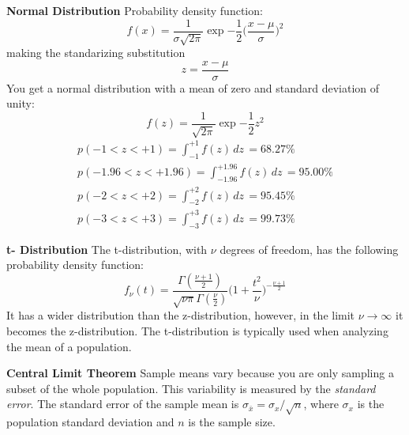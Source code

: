\vspace{+3.5mm}
\textbf{Normal Distribution}
\newline
Probability density function:
\vspace{-5.0mm}
\begin{equation}
f(x) = \frac{1}{\sigma \sqrt{2\pi}} \exp{-\frac{1}{2}\Bigg(\frac{x-\mu}{\sigma}\Bigg)^2}
\end{equation}
% 
making the standarizing substitution
\begin{equation}
z = \frac{x-\mu}{\sigma}
\end{equation}
% 
You get a normal distribution with a mean of zero and standard deviation of unity:
\begin{equation}
f(z) = \frac{1}{\sqrt{2\pi}} \exp{-\frac{1}{2} z^2}
\end{equation}
% 
\begin{equation}
\begin{array}{l}
p(-1 < z < +1) = \int_{-1}^{+1} f(z) \, dz \, = 68.27\%
\\ p(-1.96 < z < +1.96) = \int_{-1.96}^{+1.96} f(z) \, dz \, = 95.00\%
\\ p(-2 < z < +2) = \int_{-2}^{+2} f(z) \, dz \, = 95.45\%
\\ p(-3 < z < +3) = \int_{-3}^{+3} f(z) \, dz \, = 99.73\%
\end{array}
\end{equation}

\vspace{+3.5mm}
\textbf{t- Distribution}
\newline
The t-distribution, with $\nu$ degrees of freedom, has the following probability density function:
% 
\begin{equation}
f_{\nu}(t) = \frac{\Gamma(\frac{\nu + 1}{2})}{\sqrt{\nu \pi} \Gamma(\frac{\nu}{2})} \Big(1 + \frac{t^2}{\nu}\Big)^{-\frac{\nu+1}{2}}
\end{equation}
% 
It has a wider distribution than the z-distribution,
however, in the limit $\nu \rightarrow \infty$ it becomes the z-distribution.
The t-distribution is typically used when analyzing the mean of a population.

\vspace{+3.5mm}
\textbf{Central Limit Theorem}
\newline
Sample means vary because you are only sampling a subset of the whole population.\newline
This variability is measured by the \textit{standard error}.
The standard error of the sample mean is
$\sigma_{\bar{x}} = \sigma_{x} / \sqrt{n}$,
where $\sigma_{x}$ is the population standard deviation and $n$ is the sample size.

